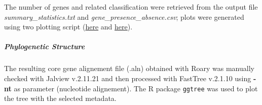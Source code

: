 The number of genes and related classification were retrieved from the output file
\textit{summary\_statistics.txt} and \textit{gene\_presence\_absence.csv}; plots were generated using two
plotting script (\href{https://github.com/sanger-pathogens/Roary/blob/master/bin/create_pan_genome_plots.R}{here}
and \href{https://github.com/sanger-pathogens/Roary/blob/master/contrib/roary_plots/roary_plots.py}{here}).


\subparagraph*{Phylogenetic Structure}

The resulting core gene alignement file (.aln) obtained with Roary was manually checked with
Jalview v.2.11.21 and then processed with FastTree v.2.1.10
using \textbf{-nt} as parameter (nucleotide alignement). The R package \texttt{ggtree} was used to plot
the tree with the selected metadata.





